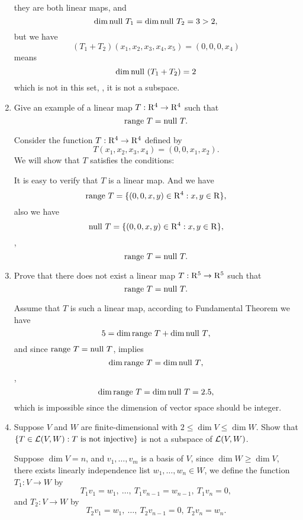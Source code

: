 \begin{enumerate}
\begin{solution}
            they are both linear maps, and 
            \[ \dim{\text{null}~T_1} = \dim{\text{null}~T_2} = 3 > 2,\]
            but we have 
            \[ (T_1 + T_2) (x_1, x_2, x_3, x_4, x_5) = (0,0,0,x_4) \]
            means 
            \[ \dim{\text{null}~(T_1 + T_2)} = 2 \]
            which is not in this set, \ie, it is not a subspace.
        \end{solution}
    \item Give an example of a linear map $T: \mathrm{R}^4 \to \mathrm{R}^4$ such that 
        \[ \text{range}~T = \text{null}~T .\]
        \begin{solution}
            Consider the function $T: \mathrm{R}^4 \to \mathrm{R}^4$ defined by 
            \[ T(x_1,x_2, x_3, x_4) = (0,0,x_1,x_2) .\]
            We will show that $T$ satisfies the conditions: 

            It is easy to verify that $T$ is a linear map. And we have 
            \[ \text{range}~T = \{(0,0,x,y) \in \mathrm{R}^4: x,y \in \mathrm{R} \}, \]
            also we have 
            \[ \text{null}~T = \{(0,0,x,y) \in \mathrm{R}^4: x,y \in \mathrm{R} \} ,\]
            \ie, 
            \[ \text{range}~T = \text{null}~T. \]
        \end{solution}
    \item Prove that there does not exist a linear map $T: \mathrm{R}^5 \to \mathrm{R}^5$ such that 
        \[ \text{range}~T = \text{null}~T. \]
        \begin{solution}
            Assume that $T$ is such a linear map, according to Fundamental Theorem we have 
            \[ 5 = \dim{\text{range}~T} + \dim{\text{null}~T},\]
            and since $\text{range}~T = \text{null}~T$, implies 
            \[ \dim{\text{range}~T} = \dim{\text{null}~T}, \]
            \ie, 
            \[ \dim{\text{range}~T} = \dim{\text{null}~T} = 2.5, \]
            which is impossible since the dimension of vector space should be integer.
        \end{solution}
    \item Suppose $V$ and $W$ are finite-dimensional with $2 \leq \dim{V} \leq \dim{W}$. Show that 
        $\{ T \in \mathcal{L}(V, W) : T \text{ is not injective}\}$ is not a subspace of $\mathcal{L}(V, W)$.
        \begin{solution}
            Suppose $\dim{V} = n$, and $v_1, \ldots, v_m$ is a basis of $V$, since $\dim{W} \geq \dim{V}$, there exists
            linearly independence list $w_1, \ldots, w_n \in W$, we define the function $T_1: V \to W$ by 
            \[ T_1v_1=w_1,\ \ldots,\ T_1v_{n-1}=w_{n-1},\ T_1v_n = 0, \]
            and $T_2 : V \to W$ by 
            \[ T_2v_1 = w_1,\ \ldots,\ T_2v_{n-1} = 0,\ T_2v_n = w_n .\]

\end{solution}
\end{enumerate}
